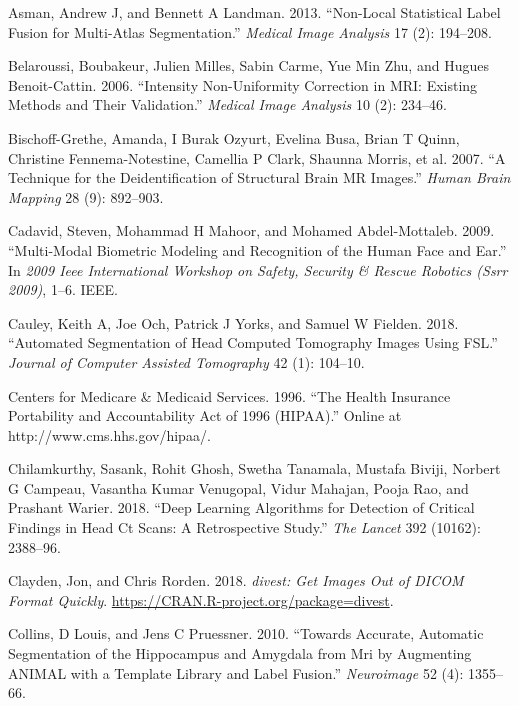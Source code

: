 \documentclass[]{elsarticle} %
\begin{document}
\leavevmode\hypertarget{ref-asman2013non}{}%
Asman, Andrew J, and Bennett A Landman. 2013. ``Non-Local Statistical Label Fusion for Multi-Atlas Segmentation.'' \emph{Medical Image Analysis} 17 (2): 194--208.

\leavevmode\hypertarget{ref-belaroussi2006intensity}{}%
Belaroussi, Boubakeur, Julien Milles, Sabin Carme, Yue Min Zhu, and Hugues Benoit-Cattin. 2006. ``Intensity Non-Uniformity Correction in MRI: Existing Methods and Their Validation.'' \emph{Medical Image Analysis} 10 (2): 234--46.

\leavevmode\hypertarget{ref-mridefacer}{}%
Bischoff-Grethe, Amanda, I Burak Ozyurt, Evelina Busa, Brian T Quinn, Christine Fennema-Notestine, Camellia P Clark, Shaunna Morris, et al. 2007. ``A Technique for the Deidentification of Structural Brain MR Images.'' \emph{Human Brain Mapping} 28 (9): 892--903.

\leavevmode\hypertarget{ref-cadavid2009multi}{}%
Cadavid, Steven, Mohammad H Mahoor, and Mohamed Abdel-Mottaleb. 2009. ``Multi-Modal Biometric Modeling and Recognition of the Human Face and Ear.'' In \emph{2009 Ieee International Workshop on Safety, Security \& Rescue Robotics (Ssrr 2009)}, 1--6. IEEE.

\leavevmode\hypertarget{ref-biasct}{}%
Cauley, Keith A, Joe Och, Patrick J Yorks, and Samuel W Fielden. 2018. ``Automated Segmentation of Head Computed Tomography Images Using FSL.'' \emph{Journal of Computer Assisted Tomography} 42 (1): 104--10.

\leavevmode\hypertarget{ref-hipaa}{}%
Centers for Medicare \& Medicaid Services. 1996. ``The Health Insurance Portability and Accountability Act of 1996 (HIPAA).'' Online at http://www.cms.hhs.gov/hipaa/.

\leavevmode\hypertarget{ref-cq500}{}%
Chilamkurthy, Sasank, Rohit Ghosh, Swetha Tanamala, Mustafa Biviji, Norbert G Campeau, Vasantha Kumar Venugopal, Vidur Mahajan, Pooja Rao, and Prashant Warier. 2018. ``Deep Learning Algorithms for Detection of Critical Findings in Head Ct Scans: A Retrospective Study.'' \emph{The Lancet} 392 (10162): 2388--96.

\leavevmode\hypertarget{ref-divest}{}%
Clayden, Jon, and Chris Rorden. 2018. \emph{divest: Get Images Out of DICOM Format Quickly}. \url{https://CRAN.R-project.org/package=divest}.

\leavevmode\hypertarget{ref-collins2010towards}{}%
Collins, D Louis, and Jens C Pruessner. 2010. ``Towards Accurate, Automatic Segmentation of the Hippocampus and Amygdala from Mri by Augmenting ANIMAL with a Template Library and Label Fusion.'' \emph{Neuroimage} 52 (4): 1355--66.
\end{document}
